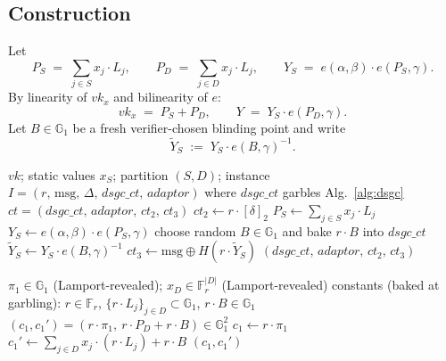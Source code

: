 \documentclass[11pt]{article}
\newcommand{\Gone}{\mathbb{G}_1}
\newcommand{\Fr}{\mathbb{F}_r}
\newcommand{\deltatwo}{[\delta]_2}
\newcommand{\msg}{\mathrm{msg}}
\newcommand{\Enc}{\mathsf{Enc}}
\begin{document}
\subsection{Construction}

Let
\begin{equation}
  P_S \;=\; \sum_{j \in S} x_j \cdot L_j,\qquad
  P_D \;=\; \sum_{j \in D} x_j \cdot L_j,\qquad
  Y_S \;=\; e(\alpha, \beta) \cdot e(P_S, \gamma).
  \label{eq:ys-def}
\end{equation}
By linearity of $vk_x$ and bilinearity of $e$:
\begin{equation}
  vk_x \;=\; P_S + P_D,\qquad
  Y \;=\; Y_S \cdot e(P_D, \gamma).
  \label{eq:y-split}
\end{equation}
Let $B \in \Gone$ be a fresh verifier-chosen blinding point and
write
\begin{equation}
  \widetilde{Y}_S \;:=\; Y_S \cdot e(B, \gamma)^{-1}.
  \label{eq:ys-tilde}
\end{equation}

\begin{algorithm}[H]
\caption{$\Enc^\star(vk, x_S, S, D;\, I)$ \hfill{\footnotesize Verifier, off-chain, $T_0$}}
\label{alg:pb-enc}
\begin{algorithmic}[1]
\Require $vk$; static values $x_S$; partition $(S, D)$;
  instance $I = (r,\, \msg,\, \Delta,\, dsgc\_ct,\, adaptor)$
  where $dsgc\_ct$ garbles Alg.~\ref{alg:dsgc}
\Ensure $ct = (dsgc\_ct,\, adaptor,\, ct_2,\, ct_3)$
\State $ct_2 \gets r \cdot \deltatwo$
\State $P_S \gets \sum_{j \in S} x_j \cdot L_j$
\State $Y_S \gets e(\alpha, \beta) \cdot e(P_S, \gamma)$
\State choose random $B \in \Gone$ and bake $r \cdot B$ into $dsgc\_ct$
\State $\widetilde{Y}_S \gets Y_S \cdot e(B, \gamma)^{-1}$
\State $ct_3 \gets \msg \oplus H(r \cdot \widetilde{Y}_S)$ 
\State \Return $(dsgc\_ct,\, adaptor,\, ct_2,\, ct_3)$
\end{algorithmic}
\end{algorithm}

\begin{algorithm}[H]
\caption{$\mathsf{DSGC}$ functionality \hfill{\footnotesize garbled at $T_0$, evaluated at $T_2$}}
\label{alg:dsgc}
\begin{algorithmic}[1]
\Require $\pi_1 \in \Gone$ (Lamport-revealed); $x_D \in \Fr^{|D|}$ (Lamport-revealed)
  \Statex constants (baked at garbling): $r \in \Fr$, $\{r \cdot L_j\}_{j \in D} \subset \Gone$, $r \cdot B \in \Gone$
\Ensure $(c_1, c_1') = (r \cdot \pi_1,\ r \cdot P_D + r \cdot B) \in \Gone^2$
\State $c_1 \gets r \cdot \pi_1$ 
\State $c_1' \gets \sum_{j \in D} x_j \cdot (r \cdot L_j) + r \cdot B$
\State \Return $(c_1, c_1')$
\end{algorithmic}
\end{algorithm}
\end{document}
